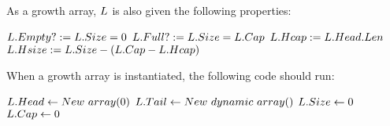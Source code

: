 As a growth array, $\VarList$ is also given the following properties:

\begin{algorithm}
	\begin{algorithmic}
		\State $L.Empty? := L.Size = 0$
		\State
		\State $L.Full? := L.Size = L.Cap$
		\State
		\State $L.Hcap := L.Head.Len$
		\State
		\State $L.Hsize := L.Size - \left(L.Cap - L.Hcap\right)$
	\end{algorithmic}
\end{algorithm}

When a growth array is instantiated, the following code should run:

\begin{algorithm}
	\begin{algorithmic}
		\Procedure{$\FuncConstructor$}{$\VarList$}
			\State $L.Head \gets New\ array(0)$
			\State $L.Tail \gets New\ dynamic\ array()$
			\State $L.Size \gets 0$
			\State $L.Cap \gets 0$
		\EndProcedure
	\end{algorithmic}
\end{algorithm}